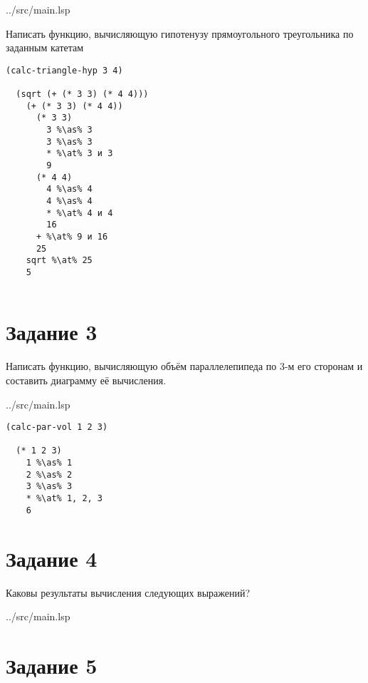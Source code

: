 \begin{lstinputlisting}[
	caption={Задание 2},
	label={lst:t4},
	style={lsp},
	linerange={12-13},
	]{../src/main.lsp}
\end{lstinputlisting}

Написать функцию, вычисляющую гипотенузу прямоугольного треугольника по заданным катетам 

\begin{lstlisting}[style={scheme}]
(calc-triangle-hyp 3 4)

  (sqrt (+ (* 3 3) (* 4 4)))
    (+ (* 3 3) (* 4 4))
      (* 3 3)
        3 %\as% 3
        3 %\as% 3
        * %\at% 3 и 3
        9
      (* 4 4)
        4 %\as% 4
        4 %\as% 4
        * %\at% 4 и 4
        16
      + %\at% 9 и 16
      25
    sqrt %\at% 25
    5
  
\end{lstlisting}

\clearpage
\section*{Задание 3}

Написать функцию, вычисляющую объём параллелепипеда по 3-м его сторонам и составить диаграмму её вычисления.

\begin{lstinputlisting}[
	caption={Задание 3},
	label={lst:t4},
	style={lsp},
	linerange={15-16},
	]{../src/main.lsp}
\end{lstinputlisting}

\begin{lstlisting}[style={scheme}]
(calc-par-vol 1 2 3)
	
  (* 1 2 3)
    1 %\as% 1
    2 %\as% 2
    3 %\as% 3
    * %\at% 1, 2, 3
    6
\end{lstlisting}

\section*{Задание 4}

Каковы результаты вычисления следующих выражений?

\begin{lstinputlisting}[
	caption={Задание 4},
	label={lst:t4},
	style={lsp},
	linerange={2-9},
	]{../src/main.lsp}
\end{lstinputlisting}

\clearpage
\section*{Задание 5}

